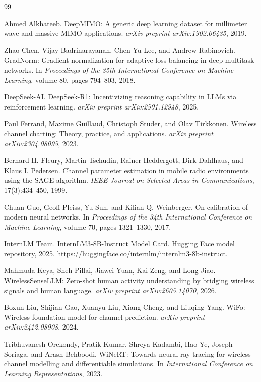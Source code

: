 \begin{thebibliography}{99}

Ahmed Alkhateeb. DeepMIMO: A generic deep learning dataset for millimeter wave and massive
MIMO applications. \emph{arXiv preprint arXiv:1902.06435}, 2019.

Zhao Chen, Vijay Badrinarayanan, Chen-Yu Lee, and Andrew Rabinovich. GradNorm: Gradient
normalization for adaptive loss balancing in deep multitask networks. In \emph{Proceedings of the
35th International Conference on Machine Learning}, volume 80, pages 794--803, 2018.

DeepSeek-AI. DeepSeek-R1: Incentivizing reasoning capability in LLMs via reinforcement learning.
\emph{arXiv preprint arXiv:2501.12948}, 2025.

Paul Ferrand, Maxime Guillaud, Christoph Studer, and Olav Tirkkonen. Wireless channel charting:
Theory, practice, and applications. \emph{arXiv preprint arXiv:2304.08095}, 2023.

Bernard H. Fleury, Martin Tschudin, Rainer Heddergott, Dirk Dahlhaus, and Klaus I. Pedersen.
Channel parameter estimation in mobile radio environments using the SAGE algorithm. \emph{IEEE
Journal on Selected Areas in Communications}, 17(3):434--450, 1999.

Chuan Guo, Geoff Pleiss, Yu Sun, and Kilian Q. Weinberger. On calibration of modern neural
networks. In \emph{Proceedings of the 34th International Conference on Machine Learning},
volume 70, pages 1321--1330, 2017.

InternLM Team. InternLM3-8B-Instruct Model Card. Hugging Face model repository, 2025.
\url{https://huggingface.co/internlm/internlm3-8b-instruct}.

Mahmuda Keya, Sneh Pillai, Jiawei Yuan, Kai Zeng, and Long Jiao. WirelessSenseLLM: Zero-shot
human activity understanding by bridging wireless signals and human language. \emph{arXiv preprint
arXiv:2605.14070}, 2026.

Boxun Liu, Shijian Gao, Xuanyu Liu, Xiang Cheng, and Liuqing Yang. WiFo: Wireless foundation
model for channel prediction. \emph{arXiv preprint arXiv:2412.08908}, 2024.

Tribhuvanesh Orekondy, Pratik Kumar, Shreya Kadambi, Hao Ye, Joseph Soriaga, and Arash
Behboodi. WiNeRT: Towards neural ray tracing for wireless channel modelling and differentiable
simulations. In \emph{International Conference on Learning Representations}, 2023.


\end{thebibliography}
